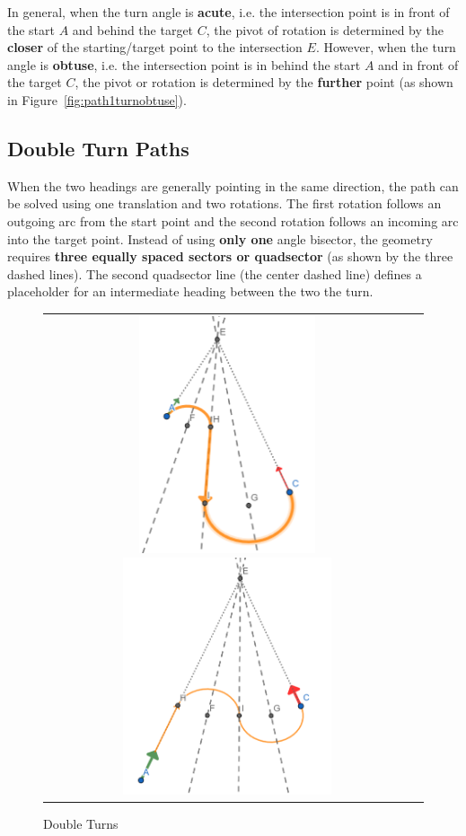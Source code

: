 \documentclass{article}
\begin{document}
In general, when the turn angle is \textbf{acute}, 
i.e. the intersection point is in front of the start $A$ and behind the target $C$, 
the pivot of rotation is determined by the \textbf{closer}
of the starting/target point to the intersection $E$.
However, when the turn angle is \textbf{obtuse}, i.e. the intersection point is in behind the start $A$ and in front of the target $C$, 
the pivot or rotation is determined by the \textbf{further}
point (as shown in Figure~\ref{fig:path1turnobtuse}).

\clearpage
\subsection*{Double Turn Paths}
When the two headings are generally pointing in the same direction, the path can be solved using one translation
and two rotations. The first rotation follows an outgoing arc from the start point and the second rotation follows
an incoming arc into the target point.
Instead of using \textbf{only one} angle bisector, the geometry requires \textbf{three equally spaced sectors or
quadsector} 
(as shown by the three dashed lines). The second quadsector line (the center dashed line) defines a placeholder for an intermediate heading 
between the two the turn.

\begin{figure}[hbt]
  \begin{tabular}{cc}
    \includegraphics[height=7cm]{screenshots/double-acute-turn-rot-trans.png}
    \includegraphics[height=7cm]{screenshots/double-acute-turn-trans-rot.png}
  \end{tabular}
  \caption{Double Turns}
  \label{fig:path2turns}
\end{figure}
\end{document}
